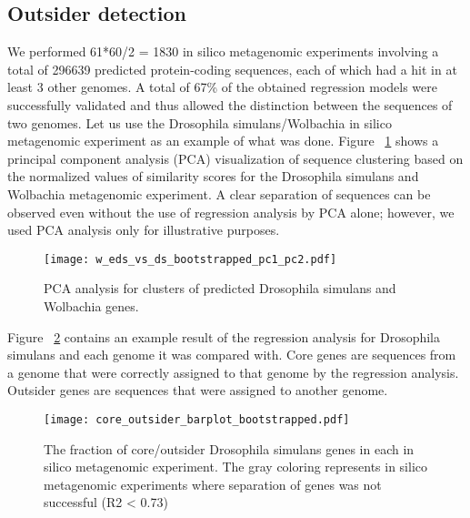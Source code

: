 \subsection{Outsider detection}
\label{outsider_detection}
We performed 61*60/2 = 1830 in silico metagenomic experiments involving a total
of 296639 predicted protein-coding sequences, each of which had a hit in at
least 3 other genomes. A total of 67\% of the obtained regression models were
successfully validated and thus allowed the distinction between the sequences
of two genomes. Let us use the Drosophila simulans/Wolbachia in silico
metagenomic experiment as an example of what was done. Figure
~\ref{fig:pca_analysis} shows a principal component analysis (PCA)
visualization of sequence clustering based on the normalized values of
similarity scores for the Drosophila simulans and Wolbachia metagenomic
experiment. A clear separation of sequences can be observed even without the
use of regression analysis by PCA alone; however, we used PCA analysis only for
illustrative purposes.
\begin{center}
\begin{figure}
\texttt{[image: w\_eds\_vs\_ds\_bootstrapped\_pc1\_pc2.pdf]}
\caption{PCA analysis for clusters of predicted Drosophila simulans
	and Wolbachia genes.}
\label{fig:pca_analysis}
\end{figure}
\end{center}
Figure ~\ref{fig:rsquared_barplot} contains an example result of the regression analysis for Drosophila
simulans and each genome it was compared with. Core genes are sequences from a
genome that were correctly assigned to that genome by the regression analysis.
Outsider genes are sequences that were assigned to another genome.
\begin{center}
\begin{figure}
\texttt{[image: core\_outsider\_barplot\_bootstrapped.pdf]}
\caption{The fraction of core/outsider Drosophila simulans genes in each in
	silico metagenomic experiment. The gray coloring represents in silico
		metagenomic experiments where separation of genes was not successful (R2 <
				0.73)}
\label{fig:rsquared_barplot}
\end{figure}
\end{center}

